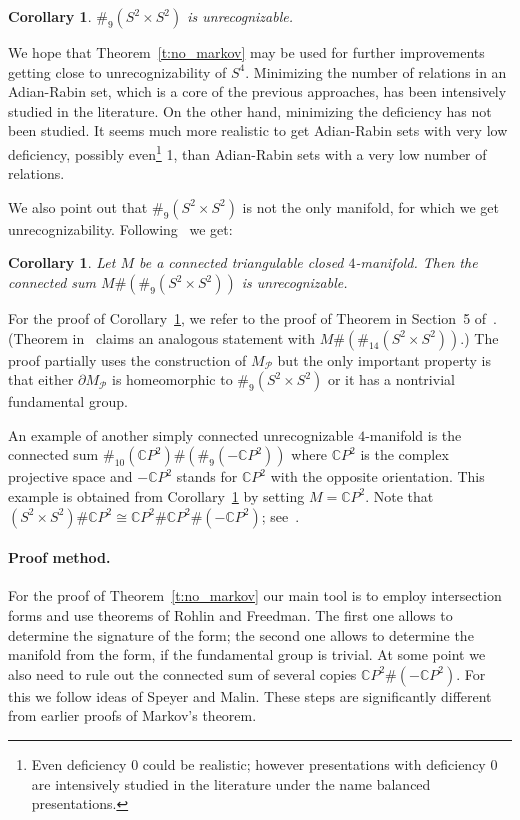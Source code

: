 \documentclass[10pt,a4paper]{article}
\newtheorem{corollary}[theorem]{Corollary}
\theoremstyle{definition}
\theoremstyle{remark}
\newcommand{\CP}{{\mathbb{C}P}}
\newcommand\PP{\mathcal{P}}
\begin{document}
\begin{corollary}
\label{c:9}
  $\#_9(S^2 \times S^2)$ is unrecognizable.
\end{corollary}

We hope that Theorem~\ref{t:no_markov} may be used for further
improvements getting close to unrecognizability of $S^4$. Minimizing the number
of relations in an Adian-Rabin set, which is a core of the previous approaches,
has been intensively studied in the literature. On the other hand, minimizing
 the deficiency has not been studied. It seems much more realistic to get
 Adian-Rabin sets with very low deficiency, possibly even\footnote{Even
 deficiency 0 could be realistic; however presentations with deficiency 0 are
 intensively studied in the literature under the name balanced presentations.}
1, than Adian-Rabin sets with a very low number of relations.

We also point out that $\#_9(S^2 \times S^2)$ is not the only manifold, for
which we get unrecognizability. Following~\cite{chernavsky-leksine06} we
get: 

\begin{corollary}
\label{c:stabilize}
  Let $M$ be a connected triangulable closed $4$-manifold. Then the connected
  sum $M \# (\#_9(S^2 \times S^2))$ is unrecognizable.
\end{corollary}

For the proof of Corollary~\ref{c:stabilize}, we refer to the proof of
Theorem in Section~5 of~\cite{chernavsky-leksine06}. (Theorem
in~\cite{chernavsky-leksine06} claims an analogous statement with $M \#
(\#_{14}(S^2 \times S^2))$.) The proof partially uses the construction of
$M_{\PP}$ but the only important property is that either $\partial M_{\PP}$ is
homeomorphic to $\#_9(S^2 \times S^2)$ or it has a nontrivial fundamental group.

An example of another simply connected unrecognizable $4$-manifold is the
connected sum $\#_{10}(\CP^2) \# (\#_9(-\CP^2))$ where $\CP^2$ is the complex
projective space and $-\CP^2$ stands for $\CP^2$ with the opposite orientation.
This example is obtained from Corollary~\ref{c:stabilize} by setting $M =
\CP^2$. Note that $(S^2 \times S^2) \# \CP^2 \cong \CP^2 \# \CP^2 \# (-\CP^2)$;
see~\cite[I.~Corollary~4.3]{kirby89}. 

\paragraph{Proof method.}
For the proof of Theorem~\ref{t:no_markov} our main tool is to employ
intersection forms and use theorems of Rohlin and Freedman. The first one
allows to determine the signature of the form; the second one allows to
determine the manifold from the form, if the fundamental group is trivial. At
some point we also need to rule out the connected sum of several copies  $\CP^2
\# (-\CP^2)$. For this we follow ideas of Speyer and Malin. These steps are
significantly different from earlier proofs of Markov's theorem.
\end{document}

